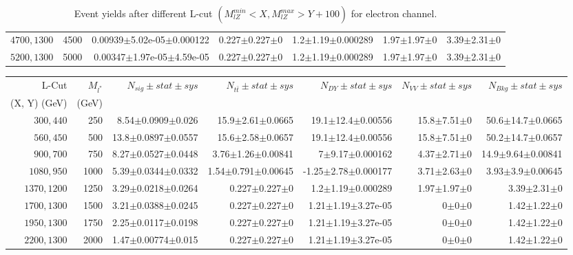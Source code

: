 \documentclass[]{article}
\begin{document}
\begin{table}
\begin{center}
{\begin{tabular}{ |r|r|r|r|r|r|r|}
$4700,1300$ & 4500 & 0.00939$\pm$5.02e-05$\pm$0.000122 & 0.227$\pm$0.227$\pm$0 & 1.2$\pm$1.19$\pm$0.000289 & 1.97$\pm$1.97$\pm$0 & 3.39$\pm$2.31$\pm$0 \\
$5200,1300$ & 5000 & 0.00347$\pm$1.97e-05$\pm$4.59e-05 & 0.227$\pm$0.227$\pm$0 & 1.2$\pm$1.19$\pm$0.000289 & 1.97$\pm$1.97$\pm$0 & 3.39$\pm$2.31$\pm$0 \\
\hline 
\end{tabular}
}
\end{center}
\caption{Event yields after different L-cut $(M_{lZ}^{min} < X, M_{lZ}^{max} > Y + 100)$ for electron channel.}
\end{table}
\begin{table}
\begin{center}
\scriptsize{
\begin{tabular}{ |r|r|r|r|r|r|r|}
\hline 
L-Cut & $M_{l^*}$ & $N_{sig}\pm stat \pm sys $ &$N_{t\bar{t}}\pm stat \pm sys $ & $N_{DY}\pm stat \pm sys $ & $N_{VV}\pm stat \pm sys $ &$N_{Bkg}\pm stat \pm sys$\\
 (X, Y) (GeV) & (GeV) & && &&\\
\hline 
$300, 440$ & 250 & 8.54$\pm$0.0909$\pm$0.026 & 15.9$\pm$2.61$\pm$0.0665 & 19.1$\pm$12.4$\pm$0.00556 & 15.8$\pm$7.51$\pm$0 & 50.6$\pm$14.7$\pm$0.0665 \\
$560, 450$ & 500 & 13.8$\pm$0.0897$\pm$0.0557 & 15.6$\pm$2.58$\pm$0.0657 & 19.1$\pm$12.4$\pm$0.00556 & 15.8$\pm$7.51$\pm$0 & 50.2$\pm$14.7$\pm$0.0657 \\
$900, 700$ & 750 & 8.27$\pm$0.0527$\pm$0.0448 & 3.76$\pm$1.26$\pm$0.00841 & 7$\pm$9.17$\pm$0.000162 & 4.37$\pm$2.71$\pm$0 & 14.9$\pm$9.64$\pm$0.00841 \\
$1080,950$ & 1000 & 5.39$\pm$0.0344$\pm$0.0332 & 1.54$\pm$0.791$\pm$0.00645 & -1.25$\pm$2.78$\pm$0.000177 & 3.71$\pm$2.63$\pm$0 & 3.93$\pm$3.9$\pm$0.00645 \\
$1370,1200$ & 1250 & 3.29$\pm$0.0218$\pm$0.0264 & 0.227$\pm$0.227$\pm$0 & 1.2$\pm$1.19$\pm$0.000289 & 1.97$\pm$1.97$\pm$0 & 3.39$\pm$2.31$\pm$0 \\
$1700,1300$ & 1500 & 3.21$\pm$0.0388$\pm$0.0245 & 0.227$\pm$0.227$\pm$0 & 1.21$\pm$1.19$\pm$3.27e-05 & 0$\pm$0$\pm$0 & 1.42$\pm$1.22$\pm$0 \\
$1950,1300$ & 1750 & 2.25$\pm$0.0117$\pm$0.0198 & 0.227$\pm$0.227$\pm$0 & 1.21$\pm$1.19$\pm$3.27e-05 & 0$\pm$0$\pm$0 & 1.42$\pm$1.22$\pm$0 \\
$2200,1300$ & 2000 & 1.47$\pm$0.00774$\pm$0.015 & 0.227$\pm$0.227$\pm$0 & 1.21$\pm$1.19$\pm$3.27e-05 & 0$\pm$0$\pm$0 & 1.42$\pm$1.22$\pm$0 \\

\end{tabular}}
\end{center}
\end{table}
\end{document}
